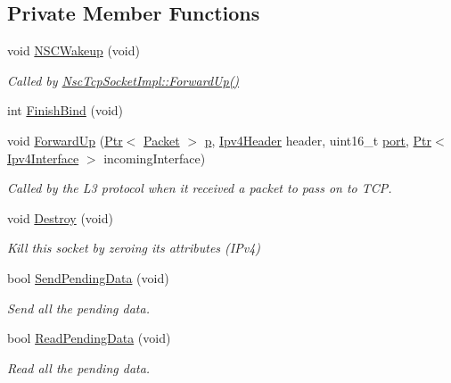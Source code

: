 \subsection*{Private Member Functions}
\begin{DoxyCompactItemize}
\item 
void \hyperlink{classns3_1_1NscTcpSocketImpl_aa5ec88a8104a8bae88dcb38cf32d5979}{N\+S\+C\+Wakeup} (void)
\begin{DoxyCompactList}\small\item\em Called by \hyperlink{classns3_1_1NscTcpSocketImpl_a39838d4cdb10b8ff73d7afdbcdc96b8b}{Nsc\+Tcp\+Socket\+Impl\+::\+Forward\+Up()} \end{DoxyCompactList}\item 
int \hyperlink{classns3_1_1NscTcpSocketImpl_af1e9f25dc27096602fff1b0f6924d9f7}{Finish\+Bind} (void)
\item 
void \hyperlink{classns3_1_1NscTcpSocketImpl_a39838d4cdb10b8ff73d7afdbcdc96b8b}{Forward\+Up} (\hyperlink{classns3_1_1Ptr}{Ptr}$<$ \hyperlink{classns3_1_1Packet}{Packet} $>$ \hyperlink{lte__link__budget__x2__handover__measures_8m_ac9de518908a968428863f829398a4e62}{p}, \hyperlink{classns3_1_1Ipv4Header}{Ipv4\+Header} header, uint16\+\_\+t \hyperlink{visualizer-ideas_8txt_a21ff1c530daf8435e00048b7fc2c58e3}{port}, \hyperlink{classns3_1_1Ptr}{Ptr}$<$ \hyperlink{classns3_1_1Ipv4Interface}{Ipv4\+Interface} $>$ incoming\+Interface)
\begin{DoxyCompactList}\small\item\em Called by the L3 protocol when it received a packet to pass on to T\+CP. \end{DoxyCompactList}\item 
void \hyperlink{classns3_1_1NscTcpSocketImpl_a36f5dcb0dce0300d367db5f0237f06b5}{Destroy} (void)
\begin{DoxyCompactList}\small\item\em Kill this socket by zeroing its attributes (I\+Pv4) \end{DoxyCompactList}\item 
bool \hyperlink{classns3_1_1NscTcpSocketImpl_a3c1fd801a0fcfdb7ff7ec9e8ffaacae1}{Send\+Pending\+Data} (void)
\begin{DoxyCompactList}\small\item\em Send all the pending data. \end{DoxyCompactList}\item 
bool \hyperlink{classns3_1_1NscTcpSocketImpl_abbbd25a777c31f3df78461d299e13886}{Read\+Pending\+Data} (void)
\begin{DoxyCompactList}\small\item\em Read all the pending data. \end{DoxyCompactList}\item 

\end{DoxyCompactItemize}
